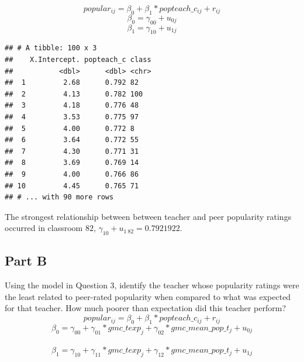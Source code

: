 \documentclass[]{article}
\newenvironment{Shaded}{\begin{snugshade}}{\end{snugshade}}
\newcommand{\KeywordTok}[1]{\textcolor[rgb]{0.13,0.29,0.53}{\textbf{#1}}}
\newcommand{\DataTypeTok}[1]{\textcolor[rgb]{0.13,0.29,0.53}{#1}}
\newcommand{\DecValTok}[1]{\textcolor[rgb]{0.00,0.00,0.81}{#1}}
\newcommand{\StringTok}[1]{\textcolor[rgb]{0.31,0.60,0.02}{#1}}
\newcommand{\OperatorTok}[1]{\textcolor[rgb]{0.81,0.36,0.00}{\textbf{#1}}}
\newcommand{\NormalTok}[1]{#1}
\begin{document}
\[popular_{ij} = \beta_{0} + \beta_1 * popteach\_c_{ij} + r_{ij}\]
\[\beta_0 = \gamma_{00} + u_{0j}\] \[\beta_1 = \gamma_{10} + u_{1j}\]

\begin{Shaded}
\end{Shaded}

\begin{verbatim}
## # A tibble: 100 x 3
##    X.Intercept. popteach_c class
##           <dbl>      <dbl> <chr>
##  1         2.68      0.792 82   
##  2         4.13      0.782 100  
##  3         4.18      0.776 48   
##  4         3.53      0.775 97   
##  5         4.00      0.772 8    
##  6         3.64      0.772 55   
##  7         4.30      0.771 31   
##  8         3.69      0.769 14   
##  9         4.00      0.766 86   
## 10         4.45      0.765 71   
## # ... with 90 more rows
\end{verbatim}

The strongest relationship between between teacher and peer popularity
ratings occurred in classroom \(82\),
\(\gamma_{10} + u_{1~82} = 0.7921922\).

\subsection{Part B}\label{part-b-4}

Using the model in Question 3, identify the teacher whose popularity
ratings were the least related to peer-rated popularity when compared to
what was expected for that teacher. How much poorer than expectation did
this teacher perform?\\
\[popular_{ij} = \beta_{0} + \beta_1 * popteach\_c_{ij} + r_{ij}\]
\[\beta_0 = \gamma_{00} + \gamma_{01}*gmc\_texp_j + \gamma_{02}*gmc\_mean\_pop\_t_j + u_{0j}\]\\
\[\beta_1 = \gamma_{10} + \gamma_{11}*gmc\_texp_j + \gamma_{12}*gmc\_mean\_pop\_t_j + u_{1j}\]
\end{document}
